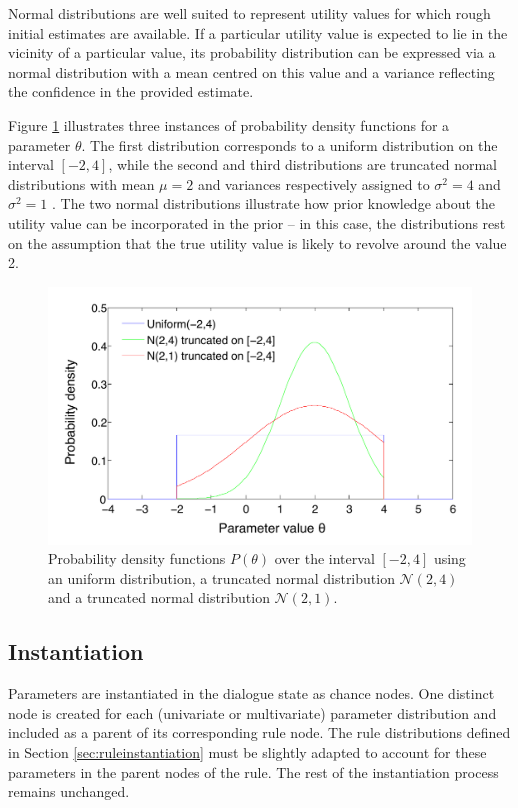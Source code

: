 Normal distributions are well suited to represent utility values for which rough initial estimates are available. If a particular utility value is expected to lie in the vicinity of a particular value, its probability distribution can be expressed via a normal distribution with a mean centred on this value and a variance reflecting the confidence in the provided estimate. 

Figure \ref{fig:uniformn} illustrates three instances of probability density functions for a parameter $\theta$.  The first distribution corresponds to a uniform distribution on the interval $[-2,4]$, while the second and third distributions are truncated normal distributions with mean $\mu=2$ and variances respectively assigned to $\sigma^2=4$ and $\sigma^2=1$ . The two normal distributions illustrate how prior knowledge about the utility value can be incorporated in the prior -- in this case, the distributions rest on the assumption that the true utility value is likely to revolve around the value 2. 

\begin{figure}[h]
\centering
\includegraphics[scale=0.45]{imgs/uniformn.pdf}
\caption{Probability density functions $P(\theta)$ over the interval $[-2,4]$ using an uniform distribution, a truncated normal distribution $\mathcal{N}(2,4)$ and a truncated normal distribution $\mathcal{N}(2,1)$.} 
\label{fig:uniformn}
\end{figure}

\subsection{Instantiation}
\label{sec:rule-params-instantiation}

Parameters are instantiated in the dialogue state as chance nodes.  One distinct node is created for each (univariate or multivariate) parameter distribution and included as a parent of its corresponding rule node. The rule distributions defined in Section \ref{sec:ruleinstantiation} must be slightly adapted to account for these parameters in the parent nodes of the rule.  The rest of the instantiation process remains unchanged. 

